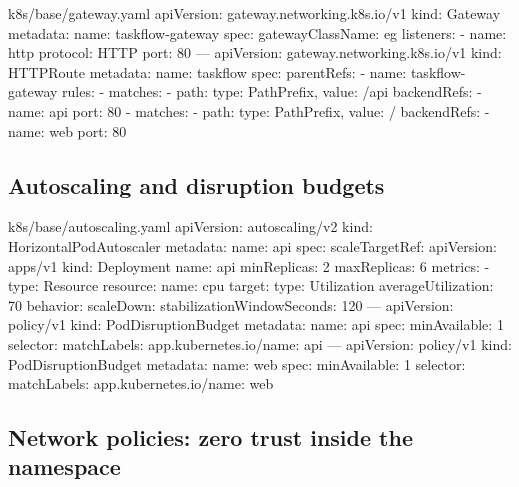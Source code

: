 \begin{yamlcode}{k8s/base/gateway.yaml}
apiVersion: gateway.networking.k8s.io/v1
kind: Gateway
metadata:
  name: taskflow-gateway
spec:
  gatewayClassName: eg
  listeners:
    - name: http
      protocol: HTTP
      port: 80
---
apiVersion: gateway.networking.k8s.io/v1
kind: HTTPRoute
metadata:
  name: taskflow
spec:
  parentRefs:
    - name: taskflow-gateway
  rules:
    - matches:
        - path: { type: PathPrefix, value: /api }
      backendRefs:
        - name: api
          port: 80
    - matches:
        - path: { type: PathPrefix, value: / }
      backendRefs:
        - name: web
          port: 80
\end{yamlcode}

\subsection{Autoscaling and disruption budgets}

\begin{yamlcode}{k8s/base/autoscaling.yaml}
apiVersion: autoscaling/v2
kind: HorizontalPodAutoscaler
metadata:
  name: api
spec:
  scaleTargetRef:
    apiVersion: apps/v1
    kind: Deployment
    name: api
  minReplicas: 2
  maxReplicas: 6
  metrics:
    - type: Resource
      resource:
        name: cpu
        target:
          type: Utilization
          averageUtilization: 70
  behavior:
    scaleDown:
      stabilizationWindowSeconds: 120
---
apiVersion: policy/v1
kind: PodDisruptionBudget
metadata:
  name: api
spec:
  minAvailable: 1
  selector:
    matchLabels:
      app.kubernetes.io/name: api
---
apiVersion: policy/v1
kind: PodDisruptionBudget
metadata:
  name: web
spec:
  minAvailable: 1
  selector:
    matchLabels:
      app.kubernetes.io/name: web
\end{yamlcode}

\subsection{Network policies: zero trust inside the namespace}

